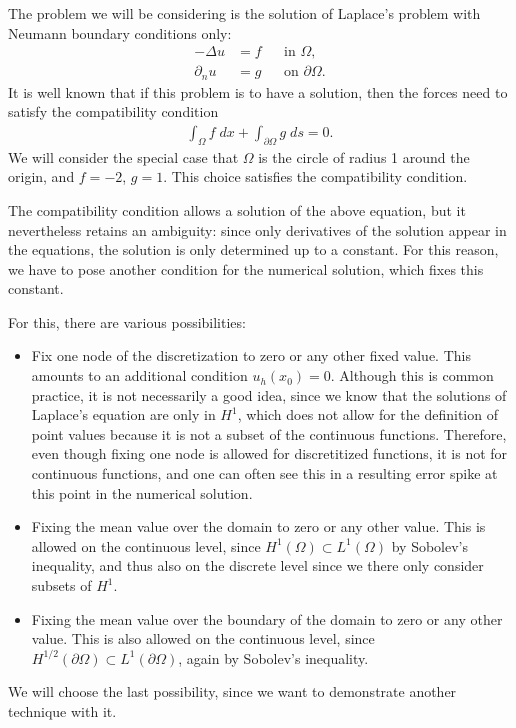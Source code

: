 \documentclass{article}
\begin{document}
The problem we will be considering is the solution of Laplace's problem with
Neumann boundary conditions only:
\begin{align*}
  -\Delta u &= f  &&\text{in $\Omega$},
  \\
  \partial_n u &= g && \text{on $\partial\Omega$}.
\end{align*}
It is well known that if this problem is to have a solution, then the forces
need to satisfy the compatibility condition
\begin{gather*}
  \int_\Omega f\; dx + \int_{\partial\Omega} g\; ds = 0.
\end{gather*}
We will consider the special case that $\Omega$ is the circle of radius 1
around the origin, and $f=-2$, $g=1$. This choice satisfies the compatibility
condition.

The compatibility condition allows a solution of the above equation, but it
nevertheless retains an ambiguity: since only derivatives of the solution
appear in the equations, the solution is only determined up to a constant. For
this reason, we have to pose another condition for the numerical solution,
which fixes this constant. 

For this, there are various possibilities:
\begin{itemize}
\item Fix one node of the discretization to zero or any other fixed value.
  This amounts to an additional condition $u_h(x_0)=0$. Although this is
  common practice, it is not necessarily a good idea, since we know that the
  solutions of Laplace's equation are only in $H^1$, which does not allow for
  the definition of point values because it is not a subset of the continuous
  functions. Therefore, even though fixing one node is allowed for
  discretitized functions, it is not for continuous functions, and one can
  often see this in a resulting error spike at this point in the numerical
  solution. 
  
\item Fixing the mean value over the domain to zero or any other value. This
  is allowed on the continuous level, since $H^1(\Omega)\subset L^1(\Omega)$
  by Sobolev's inequality, and thus also on the discrete level since we
  there only consider subsets of $H^1$.
  
\item Fixing the mean value over the boundary of the domain to zero or any
  other value. This is also allowed on the continuous level, since
  $H^{1/2}(\partial\Omega)\subset L^1(\partial\Omega)$, again by Sobolev's
  inequality.
\end{itemize}
We will choose the last possibility, since we want to demonstrate another
technique with it.
\end{document}
